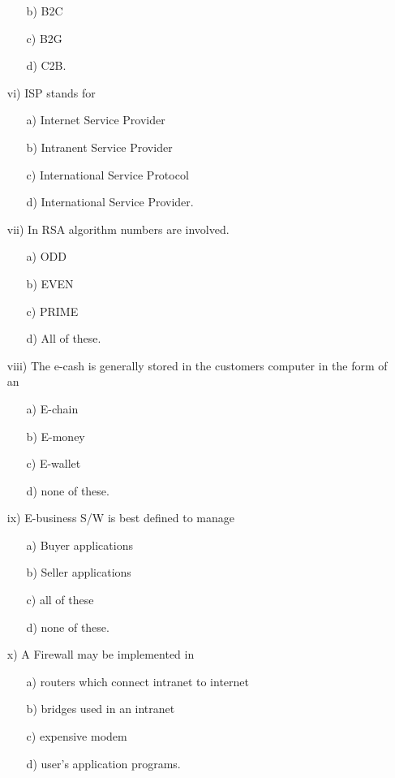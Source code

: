 \documentclass{article}
\begin{document}
\begin{enumerate}
\begin{enumerate}
        \item[b)] B2C
        \item[c)] B2G
        \item[d)] C2B.
    \end{enumerate}
    \item[vi)] ISP stands for
    \begin{enumerate}
        \item[a)] Internet Service Provider
        \item[b)] Intranent Service Provider
        \item[c)] International Service Protocol
        \item[d)] International Service Provider.
    \end{enumerate}
    \item[vii)] In RSA algorithm \underline{\hspace{2cm}} numbers are involved.
    \begin{enumerate}
        \item[a)] ODD
        \item[b)] EVEN
        \item[c)] PRIME
        \item[d)] All of these.
    \end{enumerate}
    \item[viii)] The e-cash is generally stored in the customers computer in the form of an
    \begin{enumerate}
        \item[a)] E-chain
        \item[b)] E-money
        \item[c)] E-wallet
        \item[d)] none of these.
    \end{enumerate}
    \item[ix)] E-business S/W is best defined to manage
    \begin{enumerate}
        \item[a)] Buyer applications
        \item[b)] Seller applications
        \item[c)] all of these
        \item[d)] none of these.
    \end{enumerate}
    \item[x)] A Firewall may be implemented in
    \begin{enumerate}
        \item[a)] routers which connect intranet to internet
        \item[b)] bridges used in an intranet
        \item[c)] expensive modem
        \item[d)] user's application programs.
    \end{enumerate}
\end{enumerate}
\end{document}
